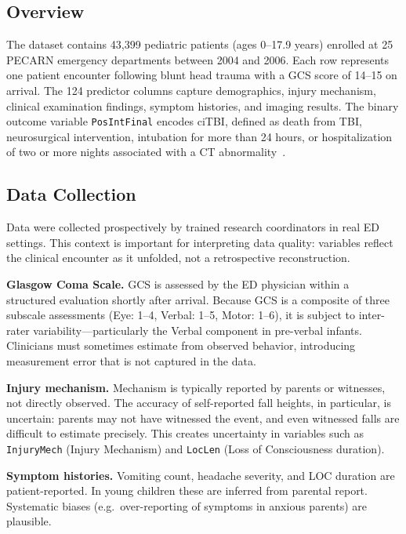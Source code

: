 \documentclass[10pt,letterpaper]{article}
\begin{document}
\subsection{Overview}
\label{data-overview}

The dataset contains 43,399 pediatric patients (ages 0--17.9 years) enrolled at 25 PECARN
emergency departments between 2004 and 2006.
Each row represents one patient encounter following blunt head trauma with a GCS score of 14--15
on arrival.
The 124 predictor columns capture demographics, injury mechanism, clinical examination findings,
symptom histories, and imaging results.
The binary outcome variable \texttt{PosIntFinal} encodes ciTBI, defined as death from TBI,
neurosurgical intervention, intubation for more than 24 hours, or hospitalization of two or more
nights associated with a CT abnormality~\cite{kuppermann2009}.

\subsection{Data Collection}
\label{data-collection}

Data were collected prospectively by trained research coordinators in real ED settings.
This context is important for interpreting data quality: variables reflect the clinical encounter
as it unfolded, not a retrospective reconstruction.

\textbf{Glasgow Coma Scale.}  GCS is assessed by the ED physician within a structured evaluation
shortly after arrival.
Because GCS is a composite of three subscale assessments (Eye: 1--4, Verbal: 1--5, Motor: 1--6),
it is subject to inter-rater variability---particularly the Verbal component in pre-verbal infants.
Clinicians must sometimes estimate from observed behavior, introducing measurement error that is
not captured in the data.

\textbf{Injury mechanism.}  Mechanism is typically reported by parents or witnesses, not directly
observed.
The accuracy of self-reported fall heights, in particular, is uncertain: parents may not have
witnessed the event, and even witnessed falls are difficult to estimate precisely.
This creates uncertainty in variables such as \texttt{InjuryMech} (Injury Mechanism) and \texttt{LocLen} (Loss of Consciousness
duration).

\textbf{Symptom histories.}  Vomiting count, headache severity, and LOC duration are patient-reported.
In young children these are inferred from parental report.
Systematic biases (e.g.\ over-reporting of symptoms in anxious parents) are plausible.
\end{document}

